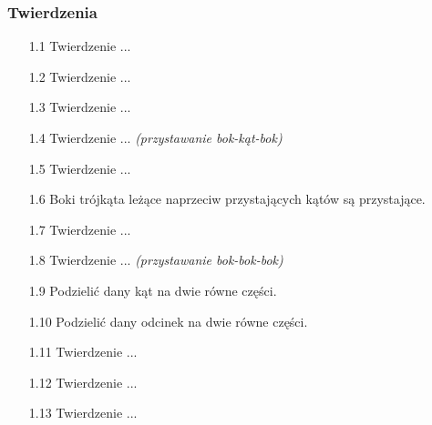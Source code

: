\subsubsection{Twierdzenia}	
\begin{enumerate}	
    \item [1.1] Twierdzenie ... %
    \item [1.2] Twierdzenie ... %
    \item [1.3] Twierdzenie ... %
    \item [1.4] Twierdzenie ... \hfill \emph{(przystawanie bok-kąt-bok)} %
    \item [1.5] Twierdzenie ... %
    \item [1.6] Boki trójkąta leżące naprzeciw przystających kątów są przystające.
    \item [1.7] Twierdzenie ... %
    \item [1.8] Twierdzenie ... \hfill \emph{(przystawanie bok-bok-bok)} %
    \item [1.9] Podzielić dany kąt na dwie równe części.
    \item [1.10] Podzielić dany odcinek na dwie równe części.
    \item [1.11] Twierdzenie ... %
    \item [1.12] Twierdzenie ... %
    \item [1.13] Twierdzenie ... %

\end{enumerate}
